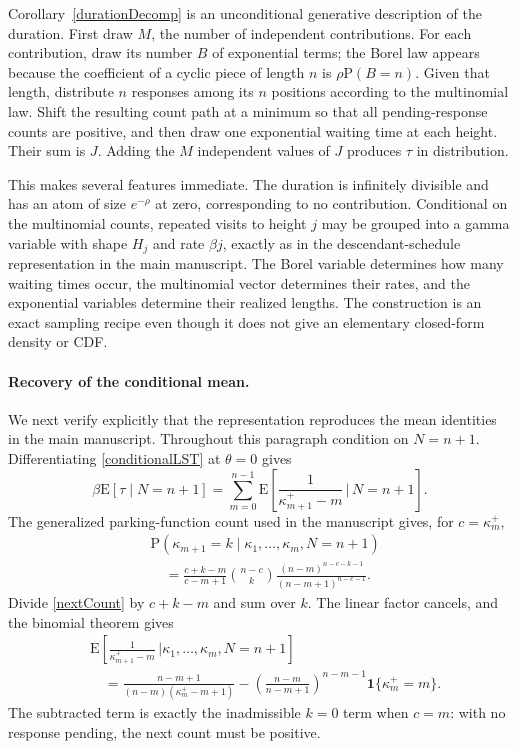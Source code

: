 \documentclass[11pt]{article}
\newcommand{\E}[1]{\mathrm{E}\left[#1\right]}
\newcommand{\PP}[1]{\mathrm{P}\left(#1\right)}
\begin{document}
Corollary~\ref{durationDecomp} is an unconditional generative
description of the duration. First draw $M$, the number of independent
contributions. For each contribution, draw its number $B$ of exponential
terms; the Borel law appears because the coefficient of a cyclic piece
of length $n$ is $\rho\PP{B=n}$. Given that length, distribute $n$
responses among its $n$ positions according to the multinomial law.
Shift the resulting count path at a minimum so that all pending-response
counts are positive, and then draw one exponential waiting time at each
height. Their sum is $J$. Adding the $M$ independent values of $J$
produces $\tau$ in distribution.

This makes several features immediate. The duration is infinitely
divisible and has an atom of size $e^{-\rho}$ at zero, corresponding to
no contribution. Conditional on the multinomial counts, repeated visits
to height $j$ may be grouped into a gamma variable with shape $H_j$ and
rate $\beta j$, exactly as in the descendant-schedule representation in
the main manuscript. The Borel variable determines how many waiting
times occur, the multinomial vector determines their rates, and the
exponential variables determine their realized lengths. The construction
is an exact sampling recipe even though it does not give an elementary
closed-form density or CDF.

\paragraph{Recovery of the conditional mean.}
We next verify explicitly that the representation reproduces the mean
identities in the main manuscript. Throughout this paragraph condition
on $N=n+1$. Differentiating \eqref{conditionalLST} at $\theta=0$ gives
\begin{equation}\label{conditionalMean}
\beta\E{\tau\mid N=n+1}
=\sum_{m=0}^{n-1}\E{\frac1{\kappa_{m+1}^+-m}\,\bigg|\,N=n+1}.
\end{equation}
The generalized parking-function count used in the manuscript gives,
for $c=\kappa_m^+$,
\begin{align}\label{nextCount}
&\PP{\kappa_{m+1}=k\mid
\kappa_1,\ldots,\kappa_m,N=n+1}\nonumber\\[-2pt]
&\quad=
\frac{c+k-m}{c-m+1}\binom{n-c}{k}
\frac{(n-m)^{n-c-k-1}}{(n-m+1)^{n-c-1}}.
\end{align}
Divide \eqref{nextCount} by $c+k-m$ and sum over $k$. The linear
factor cancels, and the binomial theorem gives
\begin{align}\label{innerMean}
&\E{\frac1{\kappa_{m+1}^+-m}\,\bigg|
\kappa_1,\ldots,\kappa_m,N=n+1}\nonumber\\[-2pt]
&\quad=
\frac{n-m+1}{(n-m)(\kappa_m^+-m+1)}
-\left(\frac{n-m}{n-m+1}\right)^{n-m-1}
\mathbf1\{\kappa_m^+=m\}.
\end{align}
The subtracted term is exactly the inadmissible $k=0$ term when
$c=m$: with no response pending, the next count must be positive.
\end{document}
